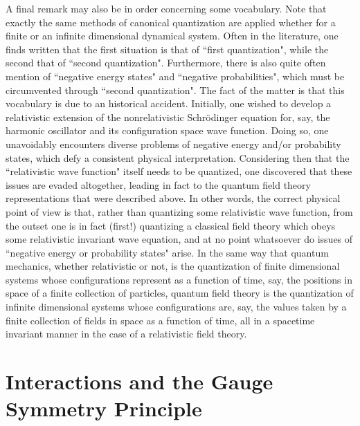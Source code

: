 \documentclass[a4paper,11pt]{article}
\begin{document}
A final remark may also be in order concerning some vocabulary. Note that
exactly the same methods of canonical quantization are applied whether
for a finite or an infinite dimensional dynamical system. Often in the
literature, one finds written that the first situation is that of
``first quantization", while the second that of ``second quantization".
Furthermore, there is also quite often mention of ``negative energy
states" and ``negative probabilities", which must be circumvented through
``second quantization". The fact of the matter is that this vocabulary
is due to an historical accident. Initially, one wished to develop a
relativistic extension of the nonrelativistic Schr\"odinger equation
for, say, the harmonic oscillator and its configuration space wave function. 
Doing so, one unavoidably encounters diverse
problems of negative energy and/or probability states, which defy a consistent
physical interpretation. Considering then that the 
``relativistic wave function" itself needs to be quantized, one
discovered that these issues are evaded altogether, leading in fact to the
quantum field theory representations that were described above.
In other words, the correct physical point of view is that, rather than
quantizing some relativistic wave function, from the outset one is in fact 
(first!) quan\-ti\-zing a classical field theory which obeys some relativistic 
invariant wave equation, and at no point whatsoever do issues of ``negative 
energy or probability states" arise.\cite{Wein1,Wein2,PS} In the same way 
that quantum mechanics,
whether relativistic or not, is the quantization of finite dimensional
systems whose configurations represent as a function of time, say, 
the positions in space of a finite collection of particles, quantum field 
theory is the quantization of infinite dimensional systems whose 
configurations are, say, the values taken by a finite collection of
fields in space as a function of time, all in a spacetime
invariant manner in the case of a relativistic field theory.


\section{Interactions and the Gauge Symmetry Principle}
\label{Sect4}
\end{document}
